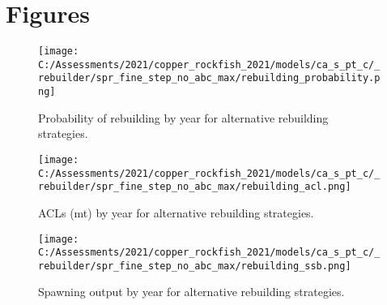 \documentclass[11pt,
  english,
  a4paper,
]{article}
\begin{document}
\leavevmode\tagmcend\tagstructend\par
\endgroup{}
\endgroup{}

\clearpage


\hypertarget{figures}{%
\section{Figures}\label{figures}}

\leavevmode\tagmcend\tagstructend


\begin{figure}
\centering
\texttt{[image: C:/Assessments/2021/copper\_rockfish\_2021/models/ca\_s\_pt\_c/\_rebuilder/spr\_fine\_step\_no\_abc\_max/rebuilding\_probability.png]}
\caption{Probability of rebuilding by year for alternative rebuilding strategies.\label{fig:prob-fig}}
\end{figure}

\tagmcend\tagstructend


\begin{figure}
\centering
\texttt{[image: C:/Assessments/2021/copper\_rockfish\_2021/models/ca\_s\_pt\_c/\_rebuilder/spr\_fine\_step\_no\_abc\_max/rebuilding\_acl.png]}
\caption{ACLs (mt) by year for alternative rebuilding strategies.\label{fig:acl-fig}}
\end{figure}

\tagmcend\tagstructend


\begin{figure}
\centering
\texttt{[image: C:/Assessments/2021/copper\_rockfish\_2021/models/ca\_s\_pt\_c/\_rebuilder/spr\_fine\_step\_no\_abc\_max/rebuilding\_ssb.png]}
\caption{Spawning output by year for alternative rebuilding strategies.\label{fig:ssb-fig}}
\end{figure}

\tagmcend\tagstructend
\end{document}

